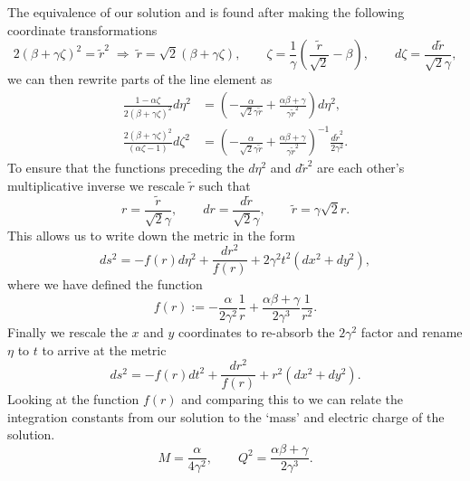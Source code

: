 The equivalence of our solution  and  is found after making the following coordinate transformations
\begin{equation*}
    2(\beta + \gamma \zeta)^2 = \tilde{r}^2 \; \Rightarrow \; \tilde{r} = \sqrt{2} (\beta + \gamma \zeta), \qquad \zeta = \frac{1}{\gamma} \left(\frac{\tilde{r}}{\sqrt{2}} -\beta \right), \qquad d\zeta = \frac{d\tilde{r}}{\sqrt{2} \gamma},
\end{equation*}
we can then rewrite parts of the line element as
\begin{equation*}
\begin{aligned}
         \frac{1 - \alpha \zeta }{2(\beta + \gamma \zeta)^2} d\eta^2 &= \left(-\frac{\alpha}{\sqrt{2} \gamma \tilde{r}} + \frac{\alpha \beta + \gamma}{\gamma \tilde{r}^2} \right) d\eta^2, \\
         \frac{2(\beta + \gamma \zeta)^2}{(\alpha \zeta - 1)} d\zeta^2 &=  \left(-\frac{\alpha}{\sqrt{2} \gamma \tilde{r}} + \frac{\alpha \beta + \gamma}{\gamma \tilde{r}^2} \right)^{-1} \frac{d\tilde{r}^2}{2 \gamma^2}.
\end{aligned}
\end{equation*}
To ensure that the functions preceding the $d\eta^2$ and $d\tilde{r}^2$ are each other's multiplicative inverse we rescale $\tilde{r}$ such that
\begin{equation*}
    r = \frac{\tilde{r}}{\sqrt{2} \gamma}, \qquad dr = \frac{d\tilde{r}}{\sqrt{2} \gamma}, \qquad \tilde{r} = \gamma \sqrt{2} r.
\end{equation*}
This allows us to write down the metric in the form
\begin{equation*}
  ds^2 = - f(r) d\eta^2 + \frac{dr^2}{f(r)} + 2 \gamma^2 t^2(dx^2 + dy^2),
\end{equation*}
where we have defined the function
\begin{equation*}
    f(r) := - \frac{\alpha}{2 \gamma^2} \frac{1}{r} + \frac{\alpha \beta + \gamma}{2 \gamma^3} \frac{1}{r^2}.
\end{equation*}
Finally we rescale the $x$ and $y$ coordinates to re-absorb the $2 \gamma^2$ factor and rename $\eta$ to $t$ to arrive at the metric
\begin{equation}
  ds^2 = - f(r) dt^2 + \frac{dr^2}{f(r)} + r^2(dx^2 + dy^2).
\end{equation}
Looking at the function $f(r)$ and comparing this to  we can relate the integration constants from our solution to the `mass' and electric charge of the solution.
\begin{equation}
\label{eq:mapintconstants}
    M = \frac{\alpha}{4 \gamma^2}, \qquad Q^2 = \frac{\alpha \beta + \gamma }{2\gamma^3}.
\end{equation}

